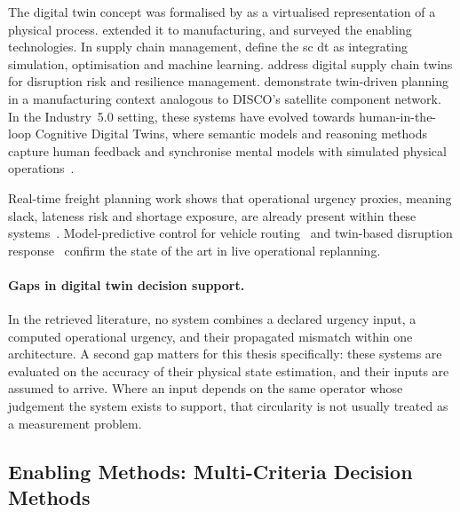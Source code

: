 The digital twin concept was formalised by \textcite{grieves2014digital} as a
virtualised representation of a physical process. \textcite{tao2018digital}
extended it to manufacturing, and \textcite{fuller2020digital} surveyed the
enabling technologies. In supply chain management, \textcite{ivanov2021digital} define the \gls{sc} \gls{dt} as integrating simulation,
optimisation and machine learning. \textcite{ivanov2020digital} address
digital supply chain twins for disruption risk and resilience management. \textcite{wang2020digital} demonstrate twin-driven planning in a manufacturing context
analogous to DISCO's satellite component network. In the Industry~5.0 setting, these
systems have evolved towards human-in-the-loop Cognitive Digital Twins, where semantic
models and reasoning methods capture human feedback and synchronise mental models with
simulated physical operations~\autocite{niloofar2023}.

Real-time freight planning work shows that operational urgency proxies, meaning slack,
lateness risk and shortage exposure, are already present within these
systems~\autocite{hrusovsky2021realtime,perez2022digital}. Model-predictive control for
vehicle routing~\autocite{karam2022realtime} and twin-based disruption
response~\autocite{ding2023realtime,leung2022digital,zhu2025industry5} confirm the state of
the art in live operational replanning.

\paragraph{Gaps in digital twin decision support.}
In the retrieved literature, no system combines a declared urgency input, a computed
operational urgency, and their propagated mismatch within one architecture. A second gap
matters for this thesis specifically: these systems are evaluated on the accuracy of their
physical state estimation, and their inputs are assumed to arrive. Where an input depends
on the same operator whose judgement the system exists to support, that circularity is not
usually treated as a measurement problem.

\subsection{Enabling Methods: Multi-Criteria Decision Methods}
\label{sec:lit_mcdm}

